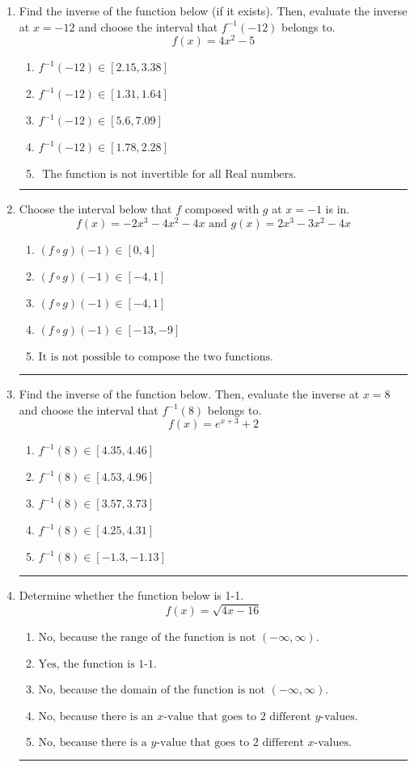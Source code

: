 \documentclass[14pt]{extbook}
\newcommand{\litem}[1]{\item#1\hspace*{-1cm}\rule{\textwidth}{0.4pt}}
\begin{document}
\begin{enumerate}
\litem{
Find the inverse of the function below (if it exists). Then, evaluate the inverse at $x = -12$ and choose the interval that $f^{-1}(-12)$ belongs to.\[ f(x) = 4 x^2 - 5 \]\begin{enumerate}[label=\Alph*.]
\item \( f^{-1}(-12) \in [2.15, 3.38] \)
\item \( f^{-1}(-12) \in [1.31, 1.64] \)
\item \( f^{-1}(-12) \in [5.6, 7.09] \)
\item \( f^{-1}(-12) \in [1.78, 2.28] \)
\item \( \text{ The function is not invertible for all Real numbers. } \)

\end{enumerate} }
\litem{
Choose the interval below that $f$ composed with $g$ at $x=-1$ is in.\[ f(x) = -2x^{3} -4 x^{2} -4 x \text{ and } g(x) = 2x^{3} -3 x^{2} -4 x \]\begin{enumerate}[label=\Alph*.]
\item \( (f \circ g)(-1) \in [0, 4] \)
\item \( (f \circ g)(-1) \in [-4, 1] \)
\item \( (f \circ g)(-1) \in [-4, 1] \)
\item \( (f \circ g)(-1) \in [-13, -9] \)
\item \( \text{It is not possible to compose the two functions.} \)

\end{enumerate} }
\litem{
Find the inverse of the function below. Then, evaluate the inverse at $x = 8$ and choose the interval that $f^{-1}(8)$ belongs to.\[ f(x) = e^{x+3}+2 \]\begin{enumerate}[label=\Alph*.]
\item \( f^{-1}(8) \in [4.35, 4.46] \)
\item \( f^{-1}(8) \in [4.53, 4.96] \)
\item \( f^{-1}(8) \in [3.57, 3.73] \)
\item \( f^{-1}(8) \in [4.25, 4.31] \)
\item \( f^{-1}(8) \in [-1.3, -1.13] \)

\end{enumerate} }
\litem{
Determine whether the function below is 1-1.\[ f(x) = \sqrt{4 x - 16} \]\begin{enumerate}[label=\Alph*.]
\item \( \text{No, because the range of the function is not $(-\infty, \infty)$.} \)
\item \( \text{Yes, the function is 1-1.} \)
\item \( \text{No, because the domain of the function is not $(-\infty, \infty)$.} \)
\item \( \text{No, because there is an $x$-value that goes to 2 different $y$-values.} \)
\item \( \text{No, because there is a $y$-value that goes to 2 different $x$-values.} \)


\end{enumerate}}
\end{enumerate}
\end{document}
